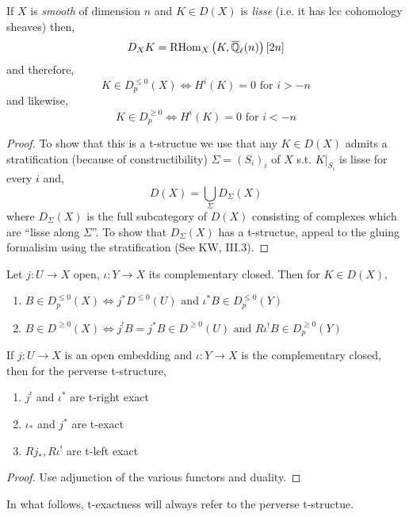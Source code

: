 \documentclass[12pt]{article}
\begin{document}
\begin{example}
If $X$ is \textit{smooth} of dimension $n$ and $K \in D(X)$ is \textit{lisse} (i.e. it has lcc cohomology sheaves) then,
\[ D_X K = \mathrm{RHom}_{X} \left( K, \overline{\mathbb{Q}}_\ell(n) \right)[2n] \]
and therefore,
\[ K \in D_p^{\le 0}(X) \iff H^i(K) = 0 \text{ for } i > - n \]
and likewise,
\[ K \in D_p^{\ge 0} \iff H^i(K) = 0 \text{ for } i < - n \]
\end{example}

\begin{proof}
To show that this is a t-structue we use that any $K \in D(X)$ admits a stratification (because of constructibility) $\Sigma = (S_i)_i$ of $X$ s.t. $K|_{S_i}$ is lisse for every $i$ and,
\[ D(X) = \bigcup_{\Sigma} D_{\Sigma}(X) \]
where $D_\Sigma(X)$ is the full subcategory of $D(X)$ consisting of complexes which are ``lisse along $\Sigma$''. To show that $D_\Sigma(X)$ has a t-structue, appeal to the gluing formalisim using the stratification (See KW, III.3).
\end{proof}

\begin{lemma}
Let $j : U \to X$ open, $\iota : Y \to X$ its complementary closed. Then for $K \in D(X)$,
\begin{enumerate}
\item $B \in D_p^{\le 0}(X) \iff j^* D^{\le 0}(U) \text{ and } \iota^* B \in D_p^{\le 0}(Y)$
\item $B \in D^{\ge 0}(X) \iff j^! B = j^* B \in D^{\ge 0}(U) \text{ and } R \iota^! B \in D_p^{\ge 0}(Y)$
\end{enumerate}
\end{lemma}

\begin{prop}
If $j : U \to X$ is an open embedding and $\iota : Y \to X$ is the complementary closed, then for the perverse t-structure,
\begin{enumerate}
\item $j^!$ and $\iota^*$ are t-right exact 
\item $\iota_*$ and $j^*$ are t-exact
\item $R j_*, R \iota^!$ are t-left exact
\end{enumerate}
\end{prop}

\begin{proof}
Use adjunction of the various functors and duality.
\end{proof}

\begin{rmk}
In what follows, t-exactness will always refer to the perverse t-structue.
\end{rmk}
\end{document}
